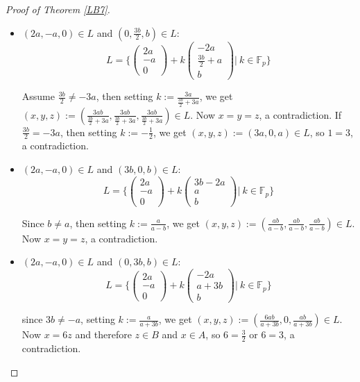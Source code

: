 \documentclass[12pt]{amsart}
\newcommand{\<}{\langle}
\renewcommand{\>}{\rangle}
\numberwithin{equation}{section}
\numberwithin{theorem}{section}
\begin{document}
\begin{proof}[Proof of Theorem \ref{LB7}]
\begin{itemize}
\item $(2a,-a,0)\in L$ and $(0,\frac{3b}{2},b)\in L$: $$L=\bigg\{\begin{pmatrix}
2a\\
-a\\
0
\end{pmatrix}+k\begin{pmatrix}
-2a\\
\frac{3b}{2}+a\\
b
\end{pmatrix}\bigg|\ k\in\mathbb{F}_p\bigg\}$$ 


Assume $\frac{3b}{2}\neq -3a$, then setting $k:=\frac{3a}{\frac{3b}{2}+3a}$, we get $(x,y,z):=(\frac{3ab}{\frac{3b}{2}+3a},\frac{3ab}{\frac{3b}{2}+3a},\frac{3ab}{\frac{3b}{2}+3a})\in L$. Now $x=y=z$, a contradiction.
If $\frac{3b}{2}= -3a$, then setting $k:=-\frac{1}{2}$, we get $(x,y,z):=(3a,0,a)\in L$, so $1=3$, a contradiction.


\item $(2a,-a,0)\in L$ and $(3b,0,b)\in L$: $$L=\bigg\{\begin{pmatrix}
2a\\
-a\\
0
\end{pmatrix}+k\begin{pmatrix}
3b-2a\\
a\\
b
\end{pmatrix}\bigg|\ k\in\mathbb{F}_p\bigg\}$$ 


Since $b\neq a$, then setting $k:=\frac{a}{a-b}$, we get $(x,y,z):=(\frac{ab}{a-b},\frac{ab}{a-b},\frac{ab}{a-b})\in L$. Now $x=y=z$, a contradiction.



\item $(2a,-a,0)\in L$ and $(0,3b,b)\in L$: $$L=\bigg\{\begin{pmatrix}
2a\\
-a\\
0
\end{pmatrix}+k\begin{pmatrix}
-2a\\
a+3b\\
b
\end{pmatrix}\bigg|\ k\in\mathbb{F}_p\bigg\}$$ 


since $3b\neq -a$, setting $k:=\frac{a}{a+3b}$, we get $(x,y,z):=(\frac{6ab}{a+3b},0,\frac{ab}{a+3b})\in L$. Now $x=6z$ and therefore $z\in B$ and $x\in A$, so $6=\frac{3}{2}$ or $6=3$, a contradiction.


\end{itemize}
\end{proof}
\end{document}
